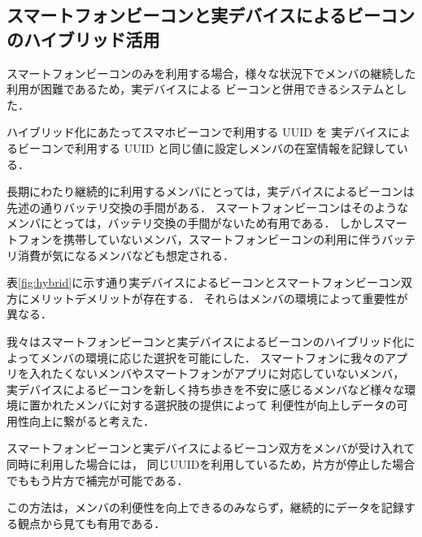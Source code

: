 \subsection{スマートフォンビーコンと実デバイスによるビーコンのハイブリッド活用}
スマートフォンビーコンのみを利用する場合，様々な状況下でメンバの継続した利用が困難であるため，実デバイスによる
ビーコンと併用できるシステムとした．

ハイブリッド化にあたってスマホビーコンで利用する UUID を
実デバイスによるビーコンで利用する UUID と同じ値に設定しメンバの在室情報を記録している．

長期にわたり継続的に利用するメンバにとっては，実デバイスによるビーコンは先述の通りバッテリ交換の手間がある．
スマートフォンビーコンはそのようなメンバにとっては，バッテリ交換の手間がないため有用である．
しかしスマートフォンを携帯していないメンバ，スマートフォンビーコンの利用に伴うバッテリ消費が気になるメンバなども想定される．

表\ref{fig:hybrid}に示す通り実デバイスによるビーコンとスマートフォンビーコン双方にメリットデメリットが存在する．
それらはメンバの環境によって重要性が異なる．

我々はスマートフォンビーコンと実デバイスによるビーコンのハイブリッド化によってメンバの環境に応じた選択を可能にした．
スマートフォンに我々のアプリを入れたくないメンバやスマートフォンがアプリに対応していないメンバ，
実デバイスによるビーコンを新しく持ち歩きを不安に感じるメンバなど様々な環境に置かれたメンバに対する選択肢の提供によって
利便性が向上しデータの可用性向上に繋がると考えた．

スマートフォンビーコンと実デバイスによるビーコン双方をメンバが受け入れて同時に利用した場合には，
同じUUIDを利用しているため，片方が停止した場合でももう片方で補完が可能である．

この方法は，メンバの利便性を向上できるのみならず，継続的にデータを記録する観点から見ても有用である．



